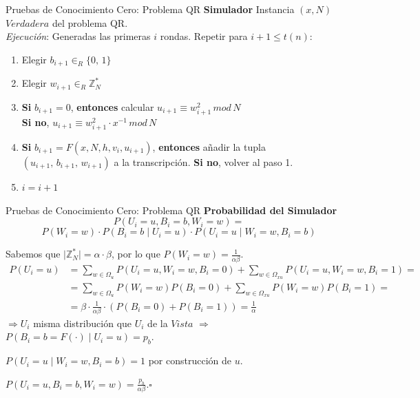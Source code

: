 \documentclass{beamer}
\begin{document}
\begin{frame}{Pruebas de Conocimiento Cero: Problema QR}
	\textbf{Simulador} Instancia $(x,N)$ $Verdadera$ del problema QR.\\
	\textit{Ejecución}: Generadas las primeras $i$ rondas. Repetir para $i+1 \leq t(n)$:
	
	\begin{enumerate}
		\item Elegir $b_{i+1} \in_R \{0,\,1\}$
		
		\item Elegir $w_{i+1} \in_R \mathbb{Z}^*_N$
		
		\item \textbf{Si} $b_{i+1} = 0$, \textbf{entonces} calcular \qquad $u_{i+1} \equiv w_{i+1}^2 \, mod \,  N$ \\
		\textbf{Si no}, \qquad \qquad \qquad \qquad \qquad \qquad \: $u_{i+1} \equiv w_{i+1}^2 \cdot x^{-1} \, mod \,  N$
		
		\item \textbf{Si} $b_{i+1} = F(x,N,h,v_i,u_{i+1})$, \textbf{entonces} añadir la tupla \\ $(u_{i+1},\,b_{i+1},\,w_{i+1})$ a la transcripción. \textbf{Si no}, volver al paso 1.
		
		\item $i = i+1$
		
	\end{enumerate}
\end{frame}


\begin{frame}{Pruebas de Conocimiento Cero: Problema QR}
	\textbf{Probabilidad del Simulador}
	{\small\[P(U_i=u, B_i=b, W_i=w) = \]
	\[P(W_i=w)\cdot P(B_i=b \mid U_i=u) \cdot P(U_i=u \mid W_i=w, B_i=b)\]}

	{\small Sabemos que $\mid \mathbb{Z}^*_N \mid = \alpha \cdot \beta $, por lo que $P(W_i=w) = \frac{1}{\alpha \beta}$.}
	{\tiny\begin{align*}
	P(U_i=u) &= \sum_{w\in \Omega_u} P(U_i=u, W_i=w, B_i = 0) + \sum_{w\in \Omega_{xu}} P(U_i=u, W_i=w, B_i = 1) =  \\
	&= \sum_{w\in \Omega_u} P(W_i=w)P(B_i = 0) + \sum_{w\in \Omega_{xu}} P(W_i=w)P(B_i = 1) = \\
	&=\beta \cdot \frac{1}{\alpha \beta} \cdot (P(B_i=0) + P(B_i=1)) = \frac{1}{\alpha}
	\end{align*}}
	{\small $\Rightarrow U_i$ misma distribución que $U_i$ de la $Vista$ $\Rightarrow$ $P(B_i=b=F(\cdot) \mid U_i=u) = p_b$.}
	
	{\small$P(U_i=u \mid W_i=w, B_i=b) = 1$ por construcción de $u$.}
	
	$P(U_i=u, B_i=b, W_i=w) = \frac{p_b}{\alpha \beta}$.\hfil $\square$
\end{frame}
\end{document}
